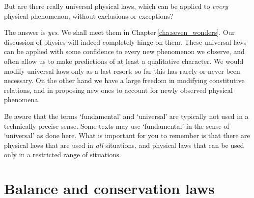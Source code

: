 \documentclass[a4paper,12pt,%
onecolumn,oneside,%
british%
]{memoir}
\renewcommand*{\|}[1][]{\nonscript\:#1\vert\nonscript\:\mathopen{}}
\newcommand*{\chap}{Chapter}%
\begin{document}
But are there really universal physical laws, which can be applied to \emph{every} physical phenomenon, without exclusions or exceptions?

The answer is \emph{yes}. We shall meet them in \chap\,\ref{cha:seven_wonders}. Our discussion of physics will indeed completely hinge on them. These universal laws can be applied with some confidence to every new phenomenon we observe, and often allow us to make predictions of at least a qualitative character. We would modify universal laws only as a last resort; so far this has rarely or never been necessary. On the other hand we have a large freedom in modifying constitutive relations, and in proposing new ones to account for newly observed physical phenomena.

\begin{warning}
  Be aware that the terms \enquote*{fundamental} and \enquote*{universal} are typically not used in a technically precise sense. Some texts may use \enquote*{fundamental} in the sense of \enquote*{universal} as done here. What is important for you to remember is that there are physical laws that are used in \emph{all} situations, and physical laws that can be used only in a restricted range of situations.
\end{warning}

\section{Balance and conservation laws}
\label{sec:balance_intro}
\end{document}
